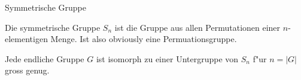 \documentclass[class=article, crop=false]{standalone}
\begin{document}
\begin{zettel}{Symmetrische Gruppe}
\begin{flashcard}[]{}
	\begin{definition}
		Die symmetrische Gruppe $S_n$ ist die Gruppe aus allen Permutationen einer $n$-elementigen Menge. Ist also obviously eine Permuationsgruppe.
	\end{definition}
\end{flashcard}

\begin{theorem}
	Jede endliche Gruppe $G$ ist isomorph zu einer Untergruppe von $S_n$ f"ur $n = |G|$ gross genug.
\end{theorem}
\end{zettel}
\end{document}
